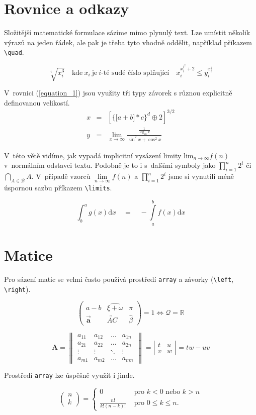\documentclass[a4paper, 11pt, twocolumn]{article}
\begin{document}
\section{Rovnice a odkazy}

Složitější matematické formulace sázíme mimo plynulý
text. Lze umístit několik výrazů na jeden řádek, ale pak je
třeba tyto vhodně oddělit, například příkazem \verb|\quad|.

$$\sqrt[i]{x_{i}^{3}} \quad \text {kde} \ x_{i} \ \text {je} \ i \text {-té sudé číslo splňující} \quad x_{i}^{x_{i}^{i^{2}}+2} \leq y_{i}^{x_{i}^{4}}$$

V~rovnici (\ref{equation_1}) jsou využity tři typy závorek s různou
explicitně definovanou velikostí.
\begin{eqnarray}
\label{equation_1} x&=&\left [\Big\{\big[a+b\big] * c\Big\}^{d} \oplus 2\right]^{3 / 2}\\
y&=&\lim _{x \to \infty} \frac{\frac{1}{\log _{10} x}}{\sin ^{2} x+\cos ^{2} x} \nonumber
\end{eqnarray}





V~této větě vidíme, jak vypadá implicitní vysázení limity lim${ }_{n \to \infty} f(n)$ v~normálním odstavci textu. Podobně
je to i s~dalšími symboly jako $\prod_{i=1}^{n} 2^{i}$ či $\bigcap_{A \in \mathcal{B}} A$. V~případě vzorců $ \lim\limits_{n\to\infty} f(n)$ a $
\prod\limits_{i=1}^{n} 2^{i}$ jsme si vynutili méně
úspornou sazbu příkazem \verb|\limits|. 

\begin{equation}
\int_{b}^{a} g(x) \mathrm{d} x\quad=\quad-\int\limits^b_a f(x) \mathrm{d} x
\end{equation}

\section{Matice}
Pro sázení matic se velmi často používá prostředí \verb|array|
a závorky (\verb|\left|, \verb|\right|).

$$
\left(\begin{array}{ccc}
a-b & \widehat{\xi+\omega} & \pi \\
\Vec{\mathbf{a}} & \overleftrightarrow{A C} & \hat{\beta}
\end{array}\right)=1 \Longleftrightarrow \mathcal{Q}=\mathbb{R}
$$

$$
\mathbf{A}=\left\|\begin{array}{cccc}
a_{11} & a_{12} & \ldots & a_{1 n} \\
a_{21} & a_{22} & \ldots & a_{2 n} \\
\vdots & \vdots & \ddots & \vdots \\
a_{m 1} & a_{m 2} & \ldots & a_{m n}
\end{array}\right\|=\left|\begin{array}{cc}
t & u \\
v & w
\end{array}\right| = tw\!-\!uv
$$

Prostředí \verb|array| lze úspěšně využít i jinde.

$$
\begin{pmatrix}
n\\k
\end{pmatrix}
=\left\{\begin{array}{cl}
0 & \text { pro } k<0 \text { nebo } k>n \\
\frac{n!}{k !(n - k) !} & \text { pro } 0 \leq k \leq n.
\end{array}\right.
$$
\end{document}
